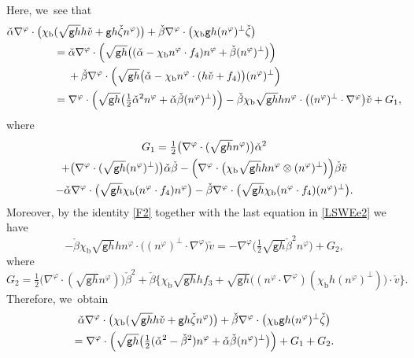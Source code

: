 \documentclass[10pt]{amsart}
\newcommand{\gr}{{\mathtt g}}
\theoremstyle{definition}
\begin{document}
Here, we~see that
\begin{align*}
\check{\alpha}\nabla^\varphi\cdot\bigl(\chi_\mathrm{b}&(\sqrt{\gr h}h\check{v} + \gr h\check{\zeta}n^\varphi)\bigr)
+ \check{\beta}\nabla^\varphi\cdot\bigl(\chi_\mathrm{b}\gr h(n^\varphi)^\perp\check{\zeta}\bigr) \\
&= \check{\alpha}\nabla^\varphi\cdot\Bigl(\sqrt{\gr h}\bigl((\check{\alpha}-\chi_\mathrm{b}n^\varphi\cdot f_4)n^\varphi + \check{\beta}(n^\varphi)^\perp\bigr)\Bigr) \\
&\quad\; + \check{\beta}\nabla^\varphi\cdot\Bigl(\sqrt{\gr h}\bigl(\check{\alpha}-\chi_\mathrm{b}n^\varphi\cdot(h\check{v}+f_4)\bigr) (n^\varphi)^\perp\Bigr) \\
&= \nabla^\varphi\cdot\Bigl(\sqrt{\gr h}\bigl(\tfrac12\check{\alpha}^2n^\varphi + \check{\alpha}\check{\beta}(n^\varphi)^\perp\bigr)\Bigr)
- \check{\beta}\chi_\mathrm{b}\sqrt{\gr h}h n^\varphi\cdot\bigl((n^\varphi)^\perp\cdot\nabla^\varphi\bigr)\check{v} + G_1,
\end{align*}
where
\begin{multline*}
G_1
= \tfrac12\bigl(\nabla^\varphi\cdot(\sqrt{\gr h}n^\varphi)\bigr)\check{\alpha}^2\\
+ \bigl(\nabla^\varphi\cdot(\sqrt{\gr h}(n^\varphi)^\perp)\bigr)\check{\alpha}\check{\beta}
- \Bigl(\nabla^\varphi\cdot\bigl(\chi_\mathrm{b}\sqrt{\gr h}h n^\varphi\otimes(n^\varphi)^\perp\bigr)\Bigr)\check{\beta}\check{v}\\
- \check{\alpha}\nabla^\varphi\cdot\bigl(\sqrt{\gr h}\chi_\mathrm{b}(n^\varphi\cdot f_4)n^\varphi\bigr)
- \check{\beta}\nabla^\varphi\cdot\bigl(\sqrt{\gr h}\chi_\mathrm{b}(n^\varphi\cdot f_4)(n^\varphi)^\perp\bigr).
\end{multline*}
Moreover, by the identity \eqref{F2} together with the last equation in \eqref{LSWEe2} we have
\[
- \check{\beta}\chi_\mathrm{b}\sqrt{\gr h}h n^\varphi\cdot\bigl((n^\varphi)^\perp\cdot\nabla^\varphi\bigr)\check{v}
= -\nabla^\varphi\bigl(\tfrac12\sqrt{\gr h}\check{\beta}^2n^\varphi\bigr) + G_2,
\]
where
\[
G_2 = \tfrac12\bigl(\nabla^\varphi\cdot(\sqrt{\gr h} n^\varphi)\bigr)\check{\beta}^2
+ \check{\beta}\bigl\{ \chi_\mathrm{b}\sqrt{\gr h}hf_3 + \sqrt{\gr h}\bigl((n^\varphi\cdot\nabla^\varphi)(\chi_\mathrm{b}h(n^\varphi)^\perp)\bigr)\cdot\check{v} \bigr\}.
\]
Therefore, we~obtain
\begin{multline}\label{EqCF2}
\check{\alpha}\nabla^\varphi\cdot\bigl(\chi_\mathrm{b}(\sqrt{\gr h}h\check{v} + \gr h\check{\zeta}n^\varphi)\bigr)
+ \check{\beta}\nabla^\varphi\cdot\bigl(\chi_\mathrm{b}\gr h(n^\varphi)^\perp\check{\zeta}\bigr) \\
= \nabla^\varphi\cdot\Bigl(\sqrt{\gr h}\bigl(\tfrac12(\check{\alpha}^2-\check{\beta}^2)n^\varphi + \check{\alpha}\check{\beta}(n^\varphi)^\perp\bigr)\Bigr) + G_1 + G_2.
\end{multline}
\end{document}
